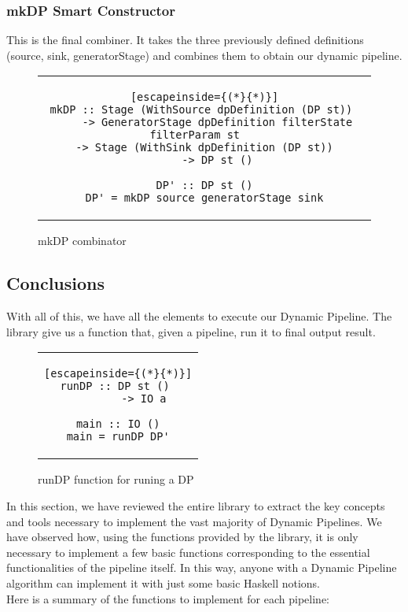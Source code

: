 \subsubsection*{mkDP Smart Constructor}
This is the final combiner. It takes the three previously defined definitions (source, sink, generatorStage) and combines them to obtain our dynamic pipeline.
\begin{figure}[H]
    \begin{tabular}{c}
        \begin{lstlisting}[escapeinside={(*}{*)}]
mkDP :: Stage (WithSource dpDefinition (DP st))	
    -> GeneratorStage dpDefinition filterState filterParam st	
    -> Stage (WithSink dpDefinition (DP st))	
    -> DP st ()

DP' :: DP st ()
DP' = mkDP source generatorStage sink
        \end{lstlisting}
    \end{tabular}
    \caption{mkDP combinator}
    \label{fig:HC13}
\end{figure}
\subsection{Conclusions}
With all of this, we have all the elements to execute our Dynamic Pipeline.
The library give us a function that, given a pipeline, run it to final output result.
\begin{figure}[H]
    \begin{tabular}{c}
        \begin{lstlisting}[escapeinside={(*}{*)}]
runDP :: DP st () 
        -> IO a
    
main :: IO ()
main = runDP DP'
        \end{lstlisting}
    \end{tabular}
    \caption{runDP function for runing a DP}
    \label{fig:HC14}
\end{figure}

In this section, we have reviewed the entire library to extract the key concepts and tools necessary to implement the vast majority of Dynamic Pipelines.
We have observed how, using the functions provided by the library, it is only necessary to implement a few basic functions corresponding to the essential functionalities of the pipeline itself.
In this way, anyone with a Dynamic Pipeline algorithm can implement it with just some basic Haskell notions. \\

Here is a summary of the functions to implement for each pipeline:

